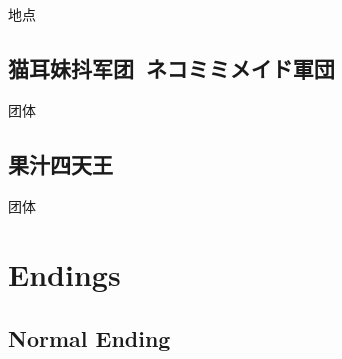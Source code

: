 \documentclass{article}
\begin{document}
地点

\subsection{猫耳妹抖军团\ ネコミミメイド軍団}

团体

\subsection{果汁四天王}

团体

\section{Endings}

\subsection{Normal Ending}
\end{document}
